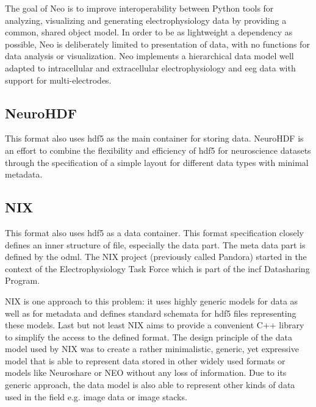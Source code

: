 The goal of Neo is to improve interoperability between Python tools for analyzing, visualizing and generating electrophysiology data by providing a common, shared object model. In order to be as lightweight a dependency as possible, Neo is deliberately limited to presentation of data, with no functions for data analysis or visualization. Neo implements a hierarchical data model well adapted to intracellular and extracellular electrophysiology and \gls{eeg} data with support for multi-electrodes. \cite{neo}

\subsection{NeuroHDF}
This format also uses \gls{hdf5} as the main container for storing data. NeuroHDF is an effort to combine the flexibility and efficiency of \gls{hdf5} for neuroscience datasets through the specification of a simple layout for different data types with minimal metadata. \cite{neurohdf} 

\subsection{NIX}
\label{nixsection}
This format also uses \gls{hdf5} as a data container. This format specification closely defines an inner structure of file, especially the data part. The meta data part is defined by the \gls{odml}. 
The NIX project (previously called Pandora) started in the context of the Electrophysiology Task Force which is part of the \gls{incf} Datasharing Program. 

NIX is one approach to this problem: it uses highly generic models for data as well as for metadata and defines standard schemata for \gls{hdf5} files representing these models. Last but not least NIX aims to provide a convenient C++ library to simplify the access to the defined format. The design principle of the data model used by NIX was to create a rather minimalistic, generic, yet expressive model that is able to represent data stored in other widely used formats or models like Neuroshare or NEO without any loss of information. Due to its generic approach, the data model is also able to represent other kinds of data used in the field e.g. image data or image stacks. \cite{pandora}

